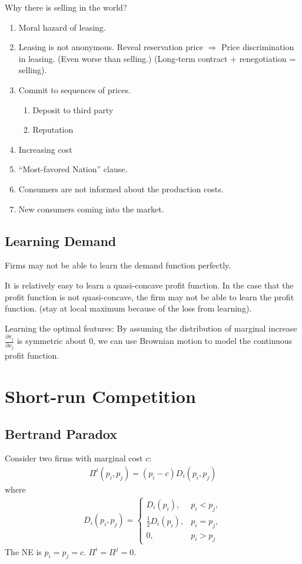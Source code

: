 \documentclass[11pt]{elegantbook}
\begin{document}
Why there is selling in the world?
\begin{enumerate}
    \item Moral hazard of leasing.
    \item Leasing is not anonymous. Reveal reservation price $\Rightarrow$ Price discrimination in leasing. (Even worse than selling.) (Long-term contract + renegotiation = selling).
    \item Commit to sequences of prices.
    \begin{enumerate}
        \item Deposit to third party
        \item Reputation
    \end{enumerate}
    \item Increasing cost
    \item ``Most-favored Nation'' clause.
    \item Consumers are not informed about the production costs.
    \item New consumers coming into the market.
\end{enumerate}

\subsection{Learning Demand}
Firms may not be able to learn the demand function perfectly.

It is relatively easy to learn a quasi-concave profit function. In the case that the profit function is not quasi-concave, the firm may not be able to learn the profit function. (stay at local maximum because of the loss from learning).

Learning the optimal features: By assuming the distribution of marginal increase $\frac{\partial \pi_j}{\partial x_j}$ is symmetric about $0$, we can use Brownian motion to model the continuous profit function.


\section{Short-run Competition}
\subsection{Bertrand Paradox}
Consider two firms with marginal cost $c$:
\begin{equation}
    \begin{aligned}
        \Pi^i(p_i,p_j)=(p_i-c)D_i(p_i,p_j)
    \end{aligned}
    \nonumber
\end{equation}
where
\begin{equation}
    \begin{aligned}
        D_i(p_i,p_j)=\left\{\begin{matrix}
            D_i(p_i),& p_i<p_j,\\
            \frac{1}{2}D_i(p_i),& p_i=p_j,\\
            0,& p_i>p_j
        \end{matrix}\right.
    \end{aligned}
    \nonumber
\end{equation}
The NE is $p_i=p_j=c$. $\Pi^i=\Pi^j=0$.
\end{document}

